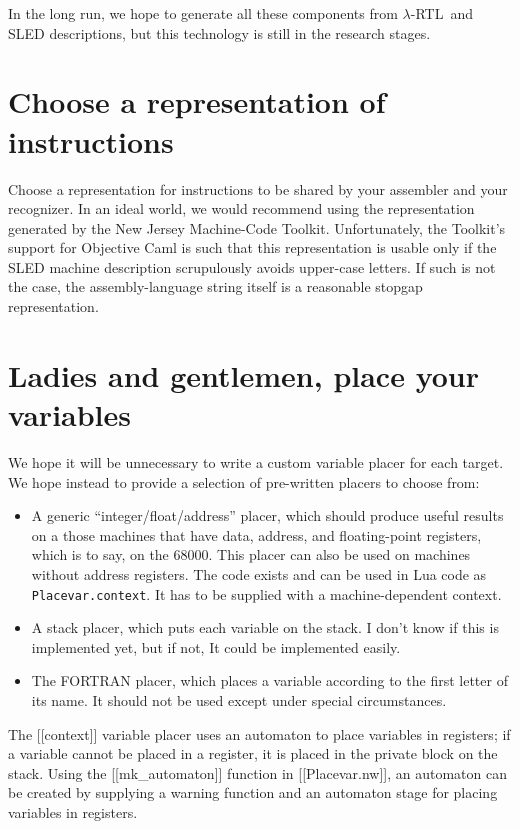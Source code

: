 \documentclass[12pt]{article}
\newcommand\lrtl{\mbox{$\lambda$-RTL}}
\begin{document}
In the long run,
we hope to generate all these components from \lrtl\ and SLED descriptions,
but this technology is still in the research stages.

\section{Choose a representation of instructions}

Choose a representation for instructions to be shared by your
assembler and your recognizer.
In an ideal world, 
we would recommend using the representation generated by the New Jersey
Machine-Code Toolkit. 
Unfortunately, the Toolkit's support for Objective Caml is such that
this representation is usable only if the SLED machine description
scrupulously avoids upper-case letters.
If such is not the case, the assembly-language string itself is a
reasonable stopgap representation.


\section{Ladies and gentlemen, place your variables} 


We hope it will be unnecessary to write a custom variable placer for
each target.
We hope instead to provide a selection of pre-written placers to
choose from:
\begin{itemize}
\item
A generic ``integer/float/address'' placer, which should produce useful
results on a those machines that have data, address, and 
floating-point registers, which is to say, on the 68000.
This placer can also be used on machines without address registers.
The code exists and can be used in Lua code as
\texttt{Placevar.context}. 
It has to be supplied with a machine-dependent context.
\item
A stack placer, which puts each variable on the stack.
I don't know if this is implemented yet, but if not, It could be
implemented easily.
\item
The FORTRAN placer, which places a variable according to the first
letter of its name.
It should not be used except under special circumstances.
\end{itemize}

The [[context]] variable placer uses an automaton to place variables in registers;
if a variable cannot be placed in a register, it is placed in the private block on the
stack.
Using the [[mk_automaton]] function in [[Placevar.nw]], an automaton can be created by
supplying a warning function and an automaton stage for placing variables in
registers.
\end{document}
